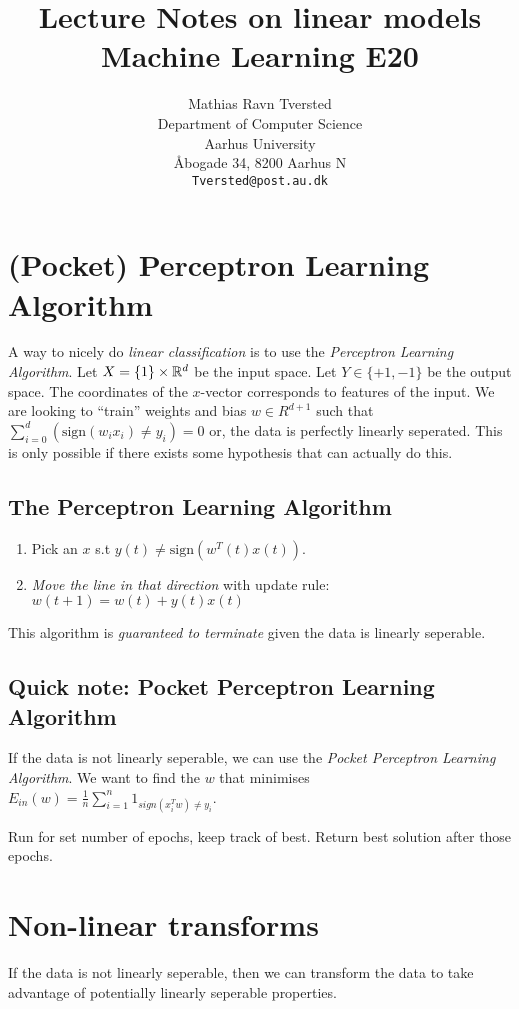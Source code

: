 \documentclass{article}
\title{Lecture Notes on linear models\\Machine Learning E20}
\author{
 Mathias Ravn Tversted \\
  Department of Computer Science\\
  Aarhus University\\
  Åbogade 34, 8200 Aarhus N \\
  \texttt{Tversted@post.au.dk} \\
}
\begin{document}
\maketitle
\tableofcontents
\newpage


\section{(Pocket) Perceptron Learning Algorithm}
  A way to nicely do \emph{linear classification} is to use the \emph{Perceptron Learning Algorithm}. 
  Let $X = \{1\} \times \mathbb{R}^d$ be the input space. Let $Y \in \{+1, -1\}$ be the output space. The coordinates of the $x$-vector corresponds to features of the input. We are looking to ``train'' weights and bias $w \in R^{d+1}$ such that $\sum_{i=0}^{d}{(\text{sign}(w_ix_i)\neq y_i)} = 0$ or, the data is perfectly linearly seperated. This is only possible if there exists some hypothesis that can actually do this.
  
  \subsection{The Perceptron Learning Algorithm}
    \begin{enumerate}
        \item Pick an $x$ s.t $y(t) \neq \text{sign}(w^T(t)x(t))$.
        \item \emph{Move the line in that direction} with update rule: $w(t+1) = w(t) + y(t)x(t)$
      \end{enumerate}
      This algorithm is \emph{guaranteed to terminate} given the data is linearly seperable.

      \subsection{Quick note: Pocket Perceptron Learning Algorithm}
        If the data is not linearly seperable, we can use the \emph{Pocket Perceptron Learning Algorithm}. We want to find the $w$ that minimises $E_{in}(w) = \frac{1}{n}\sum_{i=1}^{n}{1_{sign(x_i^Tw)\neq y_i}}$. 

        Run for set number of epochs, keep track of best. Return best solution after those epochs.

\section{Non-linear transforms}
      If the data is not linearly seperable, then we can transform the data to take advantage of potentially linearly seperable properties.
\end{document}

